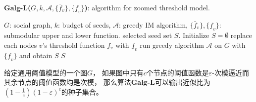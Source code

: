 \begin{algorithm}[h]
	\caption{\textbf{Galg-L($G,k,\mathcal{A},\{\overline{f}_v\},\{\underline{f}_v\}$)}: algorithm for zoomed threshold model.}
	\label{alg:Galg_L} 
	\begin{algorithmic}[1]
		\Require $G$: social graph, $k$: budget of seeds, $\mathcal{A}$: greedy IM algorithm, 
			$\{\overline{f}_v\},\{\underline{f}_v\}$: submodular upper and lower function.
		\Ensure selected seed set $S$.
		\State Initialize $S = \emptyset$
		\State replace each nodes $v$'s threshold function $f_v$ with $\underline{f}_v$
		\State run greedy algorithm $\mathcal{A}$ on $G$ with $\{\underline{f}_v\}$ and obtain $S$
		\State \Return $S$
	\end{algorithmic} 
\end{algorithm}


\begin{theorem}
\label{thm:app_alg}
给定通用阈值模型的一个图$G$，
如果图中只有$c$个节点的阈值函数是$\varepsilon$-次模逼近而其余节点的阈值函数均是次模，
那么算法{\bf Galg-L}可以输出近似比为$(1-\frac{1}{e})(1-\varepsilon)^c$的种子集合。
\end{theorem}
